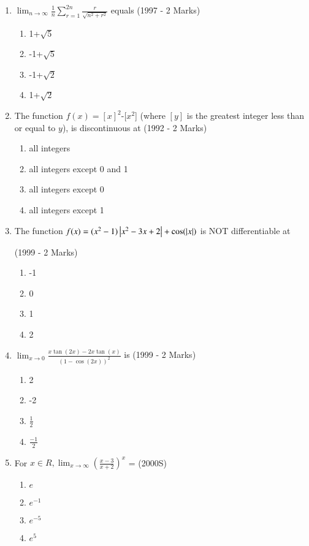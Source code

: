 \documentclass[journal,12pt,twocolumn]{IEEEtran}
\theoremstyle{remark}
\begin{document}
\begin{enumerate}[start=2]
\item $\lim_{n\to \infty}\frac{1}{n}\sum_{r=1}^{2n}\frac{r}{\sqrt{n^2+r^2}}$ equals
\hfill(1997 - 2 Marks)
  \begin{enumerate}
      \item 1+$\sqrt{5}$
      \item -1+$\sqrt{5}$
      \item -1+$\sqrt{2}$
      \item 1+$\sqrt{2}$
      
  \end{enumerate}

\item The function $f(x)=[x]^2$-[$x^2$] (where $[y]$ is the greatest integer less than or equal to $y$), is discontinuous at
\hfill(1992 - 2 Marks)
     \begin{enumerate}
         \item all integers
         \item all integers except 0 and 1
         \item all integers except 0
         \item all integers except 1
         
     \end{enumerate}

\item The function $f(x)=(x^2-1)\left\vert x^2-3x+2\right\vert+\cos(\left\vert x\right\vert)$ is NOT differentiable at

  \hfill(1999 - 2 Marks)
     \begin{enumerate}
         \item -1
         \item 0
         \item 1
         \item 2
         
     \end{enumerate}

\item $\lim_{x\to0}$$\frac{x\tan(2x)-2x\tan(x)}{(1-\cos(2x))^2}$ is
  \hfill(1999 - 2 Marks)
    \begin{enumerate}
        \item 2
        
        \item -2

        \item $\frac{1}{2}$
        
        \item $\frac{-1}{2}$
        
    \end{enumerate}

\item For $x\in R, \lim_{x\to \infty}(\frac{x-3}{x+2})^x$ =
 \hfill(2000S)
   \begin{enumerate}
       \item $e$
       \item $e^{-1}$
       \item $e^{-5}$
       \item $e^{5}$
       
   \end{enumerate}

\end{enumerate}
\end{document}
